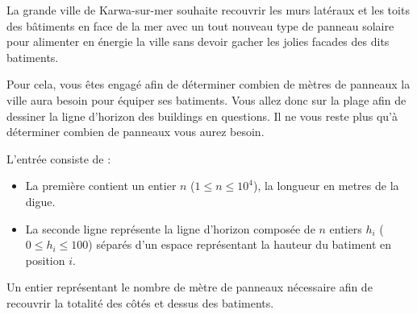 \problemname{\problemyamlname}

La grande ville de Karwa-sur-mer souhaite recouvrir les murs latéraux et les toits des bâtiments en face de la mer avec un tout nouveau type de panneau solaire pour alimenter en énergie la ville sans devoir gacher les jolies facades des dits batiments. 

Pour cela, vous êtes engagé afin de déterminer combien de mètres de panneaux la ville aura besoin pour équiper ses batiments.
Vous allez donc sur la plage afin de dessiner la ligne d'horizon des buildings en questions.
Il ne vous reste plus qu'à déterminer combien de panneaux vous aurez besoin.

\begin{Input}
	L'entrée consiste de :
	\begin{itemize}
		\item La première contient un entier $n$ ($1 \le n \le 10^4$), la longueur en metres de la digue.
		\item La seconde ligne représente la ligne d'horizon composée de $n$ entiers $h_i$ ($0 \le h_i \le 100$) séparés d'un espace représentant la hauteur du batiment en position $i$.
	\end{itemize}
\end{Input}

\begin{Output}
	Un entier représentant le nombre de mètre de panneaux nécessaire afin de recouvrir la totalité des côtés et dessus des batiments.
\end{Output}
